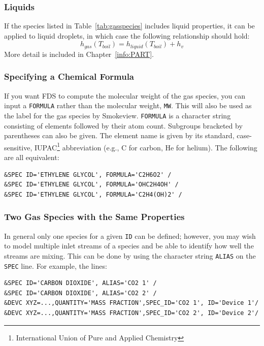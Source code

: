 \documentclass[11pt]{book}
\newcommand{\ct}{\tt\small}
\newcommand{\be}{\begin{equation}}
\newcommand{\ee}{\end{equation}}
\begin{document}
\subsubsection{Liquids}

If the species listed in Table~\ref{tab:gasspecies} includes liquid properties, it can be applied to liquid droplets, in which case the following relationship should hold:
\be
   h_{gas}(T_{boil}) = h_{liquid}(T_{boil}) + h_v
\ee
More detail is included in Chapter~\ref{info:PART}.






\subsubsection{Specifying a Chemical Formula}

If you want FDS to compute the molecular weight of the gas species, you can input a {\ct FORMULA} rather than the molecular weight, {\ct MW}.
This will also be used as the label for the gas species by Smokeview.  {\ct FORMULA} is a character string consisting of elements followed by their atom count.
Subgroups bracketed by parentheses can also be given.  The element name is given by its standard, case-sensitive, IUPAC\footnote{International Union of Pure
and Applied Chemistry} abbreviation (e.g., C for carbon, He for helium).
The following are all equivalent:

\footnotesize
\begin{verbatim}
&SPEC ID='ETHYLENE GLYCOL', FORMULA='C2H6O2' /
&SPEC ID='ETHYLENE GLYCOL', FORMULA='OHC2H4OH' /
&SPEC ID='ETHYLENE GLYCOL', FORMULA='C2H4(OH)2' /
\end{verbatim} \normalsize


\subsubsection{Two Gas Species with the Same Properties}
\label{info:SPEC_advanced}

In general only one species for a given {\ct ID} can be defined; however, you may wish to model multiple inlet streams of a species and be able to identify how well the streams are mixing.  This can be done by using the character string {\ct ALIAS} on the {\ct SPEC} line.  For example, the lines:

\footnotesize
\begin{verbatim}
&SPEC ID='CARBON DIOXIDE', ALIAS='CO2 1' /
&SPEC ID='CARBON DIOXIDE', ALIAS='CO2 2' /
&DEVC XYZ=...,QUANTITY='MASS FRACTION',SPEC_ID='CO2 1', ID='Device 1'/
&DEVC XYZ=...,QUANTITY='MASS FRACTION',SPEC_ID='CO2 2', ID='Device 2'/
\end{verbatim} \normalsize
\end{document}
